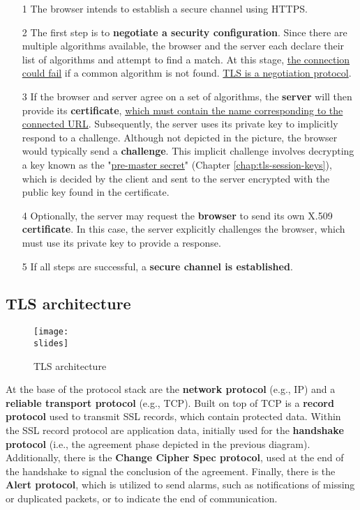 \begin{itemize}
    \item [1] The browser intends to establish a secure channel using HTTPS.
    \item [2] The first step is to \textbf{negotiate a security configuration}. Since there are multiple algorithms available, the browser and the server each declare their list of algorithms and attempt to find a match. At this stage, \ul{the connection could fail} if a common algorithm is not found. \ul{TLS is a negotiation protocol}.
    \item [3] If the browser and server agree on a set of algorithms, the \textbf{server} will then provide its \textbf{certificate}, \ul{which must contain the name corresponding to the connected URL}. Subsequently, the server uses its private key to implicitly respond to a challenge. Although not depicted in the picture, the browser would typically send a \textbf{challenge}. This implicit challenge involves decrypting a key known as the "\ul{pre-master secret}" (Chapter \ref{chap:tls-session-keys}), which is decided by the client and sent to the server encrypted with the public key found in the certificate.
    \item [4] Optionally, the server may request the \textbf{browser} to send its own X.509 \textbf{certificate}. In this case, the server explicitly challenges the browser, which must use its private key to provide a response.
    \item [5] If all steps are successful, a \textbf{secure channel is established}.
\end{itemize}


\subsection{TLS architecture}
\begin{figure}[h]
    \centering
    \texttt{[image: \\slides]}
    \caption{TLS architecture}
    \label{fig:tls-architecture}
\end{figure}

At the base of the protocol stack are the \textbf{network protocol} (e.g., IP) and a \textbf{reliable transport protocol} (e.g., TCP). Built on top of TCP is a \textbf{record protocol} used to transmit SSL records, which contain protected data. Within the SSL record protocol are application data, initially used for the \textbf{handshake protocol} (i.e., the agreement phase depicted in the previous diagram). Additionally, there is the \textbf{Change Cipher Spec protocol}, used at the end of the handshake to signal the conclusion of the agreement. Finally, there is the \textbf{Alert protocol}, which is utilized to send alarms, such as notifications of missing or duplicated packets, or to indicate the end of communication.


